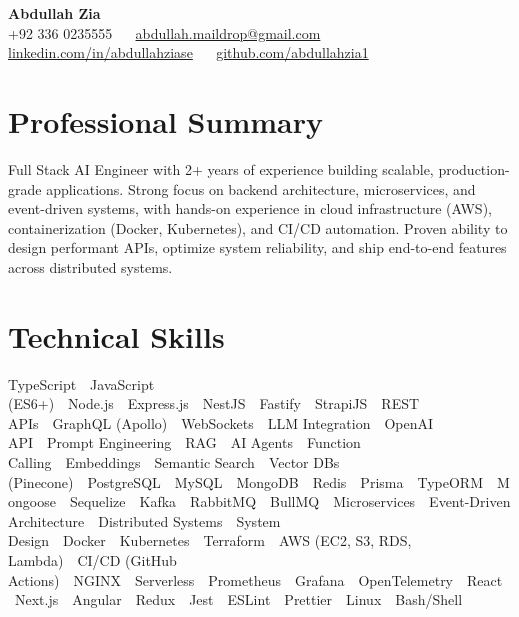 \documentclass[a4paper,10pt]{article}
\begin{document}
\setlength{\parindent}{0pt}
\linespread{1.05}
\vspace*{-0.7cm}

\newcommand{\sep}{\ \textbar\ }

\begin{center}
    {\LARGE \textbf{Abdullah Zia}} \\[4pt]
    +92 336 0235555 \sep
    \href{mailto:abdullah.maildrop@gmail.com}{abdullah.maildrop@gmail.com} \sep
    \href{https://linkedin.com/in/abdullahziase}{linkedin.com/in/abdullahziase} \sep
    \href{https://github.com/abdullahzia1}{github.com/abdullahzia1}
\end{center}

\section*{Professional Summary}
\vspace{0.2cm}

Full Stack AI Engineer with 2+ years of experience building scalable, production-grade applications. Strong focus on backend architecture, microservices, and event-driven systems, with hands-on experience in cloud infrastructure (AWS), containerization (Docker, Kubernetes), and CI/CD automation. Proven ability to design performant APIs, optimize system reliability, and ship end-to-end features across distributed systems.

\vspace{0.1cm}

\section*{Technical Skills}
\vspace{0.2cm}

TypeScript\sep JavaScript (ES6+)\sep Node.js\sep Express.js\sep NestJS\sep Fastify\sep StrapiJS\sep REST APIs\sep GraphQL (Apollo)\sep WebSockets\sep LLM Integration\sep OpenAI API\sep Prompt Engineering\sep RAG\sep AI Agents\sep Function Calling\sep Embeddings\sep Semantic Search\sep Vector DBs (Pinecone)\sep PostgreSQL\sep MySQL\sep MongoDB\sep Redis\sep Prisma\sep TypeORM\sep Mongoose\sep Sequelize\sep Kafka\sep RabbitMQ\sep BullMQ\sep Microservices\sep Event-Driven Architecture\sep Distributed Systems\sep System Design\sep Docker\sep Kubernetes\sep Terraform\sep AWS (EC2, S3, RDS, Lambda)\sep CI/CD (GitHub Actions)\sep NGINX\sep Serverless\sep Prometheus\sep Grafana\sep OpenTelemetry\sep React\sep Next.js\sep Angular\sep Redux\sep Jest\sep ESLint\sep Prettier\sep Linux\sep Bash/Shell
\end{document}
